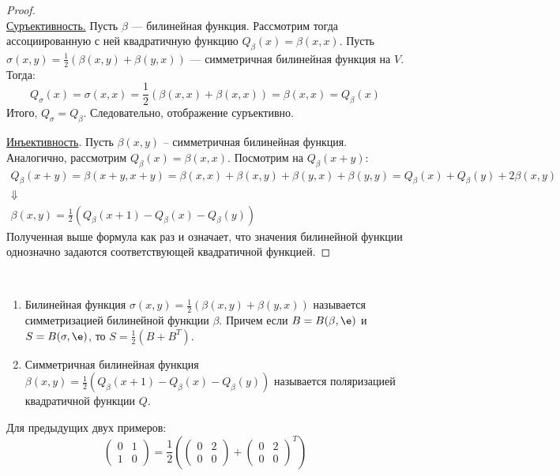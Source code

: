 \begin{proof}\ \\
\underline{Суръективность.} Пусть $\beta$ --- билинейная функция. Рассмотрим тогда ассоциированную с ней квадратичную функцию $Q_\beta(x) = \beta(x, x)$. Пусть $\sigma(x, y) = \frac{1}{2}(\beta(x, y) + \beta(y, x))$ --- симметричная билинейная функция на $V$. Тогда:
$$
Q_\sigma(x) = \sigma(x, x) = \frac{1}{2}(\beta(x, x) + \beta(x, x)) = \beta(x, x) = Q_\beta(x)
$$
Итого, $Q_\sigma = Q_\beta$. Следовательно, отображение суръективно.

\underline{Инъективность}. Пусть $\beta(x, y)$ -- симметричная билинейная функция. Аналогично, рассмотрим $Q_\beta(x) = \beta(x, x)$. Посмотрим на $Q_\beta(x + y)$:
\begin{gather*}
Q_\beta(x + y) = \beta(x + y, x + y) = \beta(x, x) + \beta(x, y) + \beta(y, x) + \beta(y, y) = Q_\beta(x) + Q_\beta(y) + 2\beta(x, y) \\
\Downarrow \\
\beta(x, y) = \frac{1}{2}\left( Q_\beta(x + 1) - Q_\beta(x) - Q_\beta(y)  \right)
\end{gather*}
Полученная выше формула как раз и означает, что значения билинейной функции однозначно задаются соответствующей квадратичной функцией.
\end{proof}

\begin{Comment}\
\begin{enumerate}
\item Билинейная функция $\sigma(x, y) = \frac{1}{2}(\beta(x, y) + \beta(y, x))$ называется симметризацией билинейной функции $\beta$. Причем если $B = B(\beta, \e)$ и $S = B(\sigma, \e)$, то $S = \frac{1}{2}(B + B^T)$.
\item Симметричная билинейная функция $\beta(x, y) = \frac{1}{2}\left( Q_\beta(x + 1) - Q_\beta(x) - Q_\beta(y)  \right)$ называется поляризацией квадратичной функции $Q$.
\end{enumerate}
\end{Comment}

\begin{Examples}
Для предыдущих двух примеров:
$$
\begin{pmatrix}
0 & 1 \\
1 & 0
\end{pmatrix} = \frac{1}{2}\left(
\begin{pmatrix}
0 & 2 \\
0 & 0
\end{pmatrix}
+ 
\begin{pmatrix}
0 & 2 \\
0 & 0
\end{pmatrix}^T
\right)
$$
\end{Examples}

